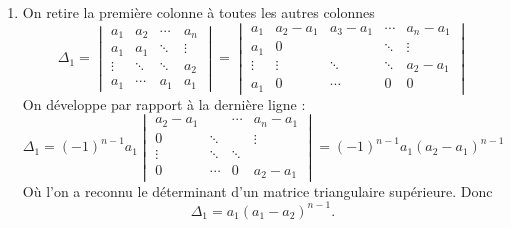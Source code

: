 \documentclass[11pt,a4paper]{article}
\begin{document}
\begin{enumerate}
  \item On retire la première colonne à toutes les autres colonnes 
$$
\Delta_1 =   \begin{vmatrix}
     a_1   &a_2   &\cdots&a_n    \\
     a_1   &a_1   &\ddots&\vdots \\
     \vdots&\ddots&\ddots&a_2    \\
     a_1   &\cdots&a_1   &a_1
   \end{vmatrix}
 =  \begin{vmatrix}
     a_1   &a_2-a_1  & a_3-a_1 &\cdots&a_n -a_1   \\
     a_1   &0  & &\ddots&\vdots \\
     \vdots&\vdots &\ddots&\ddots&a_2-a_1    \\
     a_1   &0&\cdots&0   & 0
   \end{vmatrix}$$
On développe par rapport à la dernière ligne :
$$\Delta_1 = (-1)^{n-1}a_1 \begin{vmatrix}
     a_2-a_1  &  &\cdots&a_n -a_1   \\
     0  &\ddots &&\vdots \\
     \vdots &\ddots&\ddots&    \\
     0&\cdots&0   & a_2-a_1
   \end{vmatrix}
= (-1)^{n-1}a_1(a_2-a_1)^{n-1}
$$
Où l'on a reconnu le déterminant d'un matrice triangulaire supérieure.
Donc 
$$\Delta_1 = a_1(a_1-a_2)^{n-1}.$$



\end{enumerate}
\end{document}
